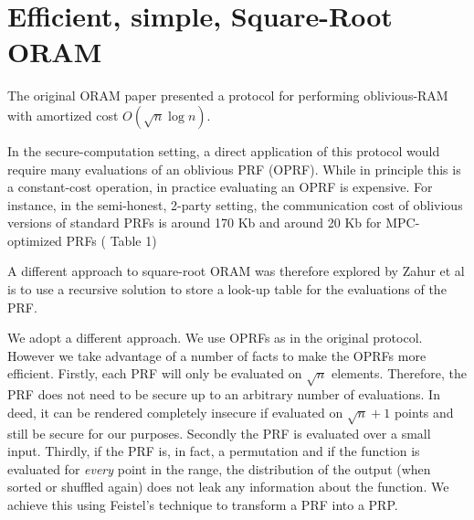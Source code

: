 \section{Efficient, simple, Square-Root ORAM}

The original ORAM paper \cite{ostrovsky1997private} presented a protocol for performing
oblivious-RAM with amortized cost $O(\sqrt{n} \log{n})$.

In the secure-computation setting, a direct application of this
protocol would require many evaluations of an oblivious PRF (OPRF).
While in principle this is a constant-cost operation, in practice evaluating an OPRF is expensive. For instance, in the semi-honest, 2-party setting, the communication cost of oblivious versions of standard PRFs is around 170 Kb and around 20 Kb for MPC-optimized PRFs (\cite{hemenway2019private} Table 1) %

A different approach to square-root ORAM was therefore explored by Zahur et al is to use a recursive solution to store a look-up table for the evaluations of the PRF.

We adopt a different approach. We use OPRFs as in the original protocol.
However we take advantage of a number of facts to make the OPRFs more efficient.
Firstly, each PRF will only be evaluated on $\sqrt{n}$ elements.
Therefore, the PRF does not need to be secure up to an arbitrary number of 
evaluations. In deed, it can be rendered completely insecure if evaluated
on $\sqrt{n} + 1$ points and still be secure for our purposes.
Secondly the PRF is evaluated over a small input.
Thirdly, if the PRF is, in fact, a permutation and 
if the function is evaluated for \emph{every} point in the range,
the distribution of the output (when sorted or shuffled again)
does not leak any information about the function.
We achieve this using Feistel's technique to transform a PRF into a PRP.

